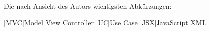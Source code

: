 \chapter*{\nameoflistofacronyms}

Die nach Ansicht des Autors wichtigsten Abkürzungen:
\bigskip

\begin{adjustwidth}{1.5em}{}
\begin{acronym}[AAAAA] %
	
	
	[MVC]{Model View Controller}
	[UC]{Use Case}
	[JSX]{JavaScript XML}

	
	
	
\end{acronym}	
\end{adjustwidth}
